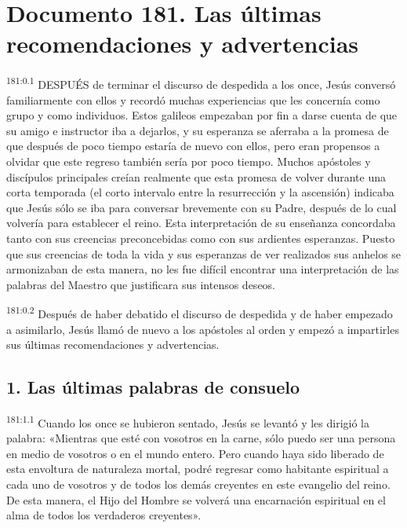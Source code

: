 \chapter{Documento 181. Las últimas recomendaciones y advertencias}
\par 
\textsuperscript{181:0.1} DESPUÉS de terminar el discurso de despedida a los once, Jesús conversó familiarmente con ellos y recordó muchas experiencias que les concernía como grupo y como individuos. Estos galileos empezaban por fin a darse cuenta de que su amigo e instructor iba a dejarlos, y su esperanza se aferraba a la promesa de que después de poco tiempo estaría de nuevo con ellos, pero eran propensos a olvidar que este regreso también sería por poco tiempo. Muchos apóstoles y discípulos principales creían realmente que esta promesa de volver durante una corta temporada (el corto intervalo entre la resurrección y la ascensión) indicaba que Jesús sólo se iba para conversar brevemente con su Padre, después de lo cual volvería para establecer el reino. Esta interpretación de su enseñanza concordaba tanto con sus creencias preconcebidas como con sus ardientes esperanzas. Puesto que sus creencias de toda la vida y sus esperanzas de ver realizados sus anhelos se armonizaban de esta manera, no les fue difícil encontrar una interpretación de las palabras del Maestro que justificara sus intensos deseos.

\par 
\textsuperscript{181:0.2} Después de haber debatido el discurso de despedida y de haber empezado a asimilarlo, Jesús llamó de nuevo a los apóstoles al orden y empezó a impartirles sus últimas recomendaciones y advertencias.

\section*{1. Las últimas palabras de consuelo}
\par 
\textsuperscript{181:1.1} Cuando los once se hubieron sentado, Jesús se levantó y les dirigió la palabra: «Mientras que esté con vosotros en la carne, sólo puedo ser una persona en medio de vosotros o en el mundo entero. Pero cuando haya sido liberado de esta envoltura de naturaleza mortal, podré regresar como habitante espiritual a cada uno de vosotros y de todos los demás creyentes en este evangelio del reino. De esta manera, el Hijo del Hombre se volverá una encarnación espiritual en el alma de todos los verdaderos creyentes».

